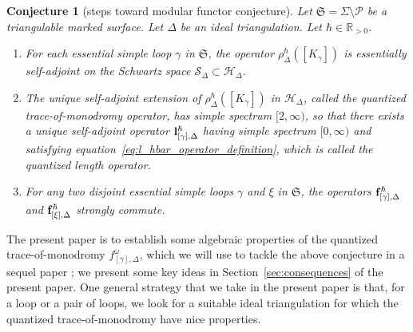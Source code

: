 \documentclass[pdftex]{sigma}
\numberwithin{equation}{section}
\newtheorem{Conjecture}[Theorem]{Conjecture}
\theoremstyle{definition}
\begin{document}
\begin{Conjecture}[steps toward modular functor conjecture]
\label{conjecture:sequel}
Let $\mathfrak{S} = \Sigma \setminus \mathcal{P}$ be a triangulable marked surface. Let $\Delta$ be an ideal triangulation. Let $\hbar \in \mathbb{R}_{>0}$.
\begin{enumerate}[label={\rm (\arabic*)}]\itemsep=0pt
\item For each essential simple loop $\gamma$ in $\mathfrak{S}$, the operator $\rho^\hbar_\Delta([K_\gamma])$ is essentially self-adjoint on the Schwartz space $\mathscr{S}_\Delta \subset \mathscr{H}_\Delta$.
\item The unique self-adjoint extension  of $\rho^\hbar_\Delta([K_\gamma])$ in $\mathscr{H}_\Delta$, called the quantized trace\nobreakdash-of-mo\-no\-dromy operator, has simple spectrum $[2,\infty)$, so that there exists a unique self\nobreakdash-ad\-joint operator ${\bf l}^\hbar_{[\gamma],\Delta}$ having simple spectrum $[0,\infty)$ and satisfying equation~\eqref{eq:l_hbar_operator_definition}, which is called the quantized length operator.
\item For any two disjoint essential simple loops $\gamma$ and $\xi$ in $\mathfrak{S}$, the operators ${\bf f}^\hbar_{[\gamma],\Delta}$ and ${\bf f}^\hbar_{[\xi],\Delta}$ strongly commute.
\end{enumerate}
\end{Conjecture}
The present paper is to establish some algebraic properties of the quantized trace\nobreakdash-of\nobreakdash-mo\-no\-dromy $f^\omega_{[\gamma],\Delta}$, which we will use to tackle the above conjecture in a sequel paper \cite{sequel}; we present some key ideas in Section~\ref{sec:consequences} of the present paper. One general strategy that we take in the present paper is that, for a loop or a pair of loops, we look for a suitable ideal triangulation for which the quantized trace-of-monodromy have nice properties.
\end{document}
